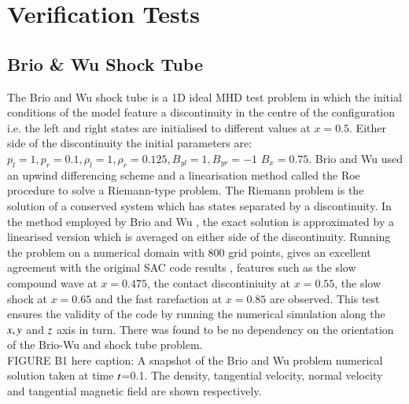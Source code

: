 \documentclass[final,1p]{elsarticle}
\begin{document}
\section{ Verification Tests}

\subsection{Brio \& Wu Shock Tube}
The Brio and Wu \cite{BrioWu1988} shock tube is a 1D ideal MHD test problem in which the initial conditions of the model feature a discontinuity in the centre of the configuration i.e. the left and right states are initialised to different values at $x=0.5$. Either side of the discontinuity the initial parameters are: $p_{l}=1,p_{r}=0.1,\rho_{l}=1,\rho_{r}=0.125,B_{yl}=1,B_{yr}=-1$ $B_{x}=0.75$. Brio and Wu used an upwind differencing scheme and  a linearisation method called the Roe procedure \cite{Roe1981} to solve a Riemann-type problem. The Riemann problem is the solution of a conserved system which has states separated by a discontinuity. In the method employed by Brio and Wu \cite{BrioWu1988}, the exact solution is approximated by a linearised version which is averaged on either side of the discontinuity. Running the problem on a numerical domain with 800 grid points, gives an excellent agreement with the original SAC code results \cite{Shelyag2008}, features such as the slow compound wave at $x=0.475$, the contact discontiniuity at $x=0.55$, the slow shock at $x=0.65$ and the fast rarefaction at $x=0.85$ are observed. This test ensures the validity of the code by running the numerical simulation along the $\it{x} , \it{y}$ and $\it{z}$ axis in turn. There was found to be no dependency on the orientation of the Brio-Wu and shock tube problem.\\

FIGURE B1 here caption: A snapshot of the Brio and Wu problem numerical solution taken at time $\it t$=0.1. The density, tangential velocity, normal velocity and tangential magnetic field are shown respectively.

\end{document}
